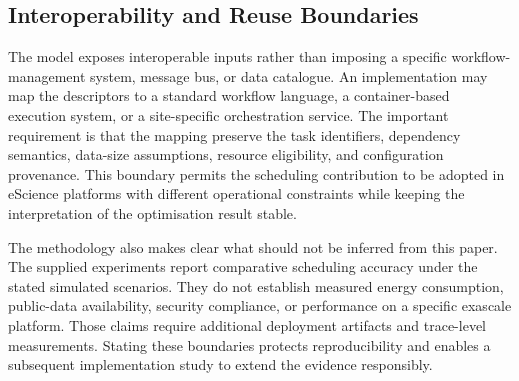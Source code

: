 \subsection{Interoperability and Reuse Boundaries}

The model exposes interoperable inputs rather than imposing a specific workflow-management system, message bus, or data catalogue. An implementation may map the descriptors to a standard workflow language, a container-based execution system, or a site-specific orchestration service. The important requirement is that the mapping preserve the task identifiers, dependency semantics, data-size assumptions, resource eligibility, and configuration provenance. This boundary permits the scheduling contribution to be adopted in eScience platforms with different operational constraints while keeping the interpretation of the optimisation result stable.

The methodology also makes clear what should not be inferred from this paper. The supplied experiments report comparative scheduling accuracy under the stated simulated scenarios. They do not establish measured energy consumption, public-data availability, security compliance, or performance on a specific exascale platform. Those claims require additional deployment artifacts and trace-level measurements. Stating these boundaries protects reproducibility and enables a subsequent implementation study to extend the evidence responsibly.
